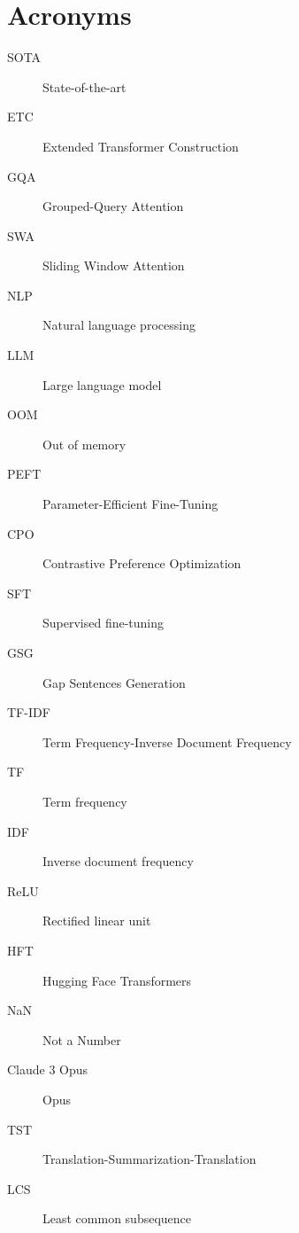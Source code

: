 \documentclass[english, ba, kiv, he, iso690numb, pdf, viewonly]{fasthesis}
\begin{document}
\chapter{Acronyms}
\begin{description}
\item[SOTA] State-of-the-art 
\item[ETC] Extended Transformer Construction
\item[GQA] Grouped-Query Attention
\item[SWA] Sliding Window Attention
\item[NLP] Natural language processing
\item[LLM] Large language model
\item[OOM] Out of memory
\item[PEFT] Parameter-Efficient Fine-Tuning
\item[CPO] Contrastive Preference Optimization
\item[SFT] Supervised fine-tuning
\item[GSG] Gap Sentences Generation
\item[TF-IDF] Term Frequency-Inverse Document Frequency
\item[TF] Term frequency
\item[IDF] Inverse document frequency
\item[ReLU] Rectified linear unit
\item[HFT] Hugging Face Transformers
\item[NaN] Not a Number
\item[Claude 3 Opus] Opus
\item[TST] Translation-Summarization-Translation
\item[LCS] Least common subsequence
\end{description}
%
%
%
%

%
%
%
%


%
%
%
%
\backmatter
\printbibliography
\listoffigures
\listoftables
\listoflistings
%
%
\setbackpageqrcode
\backpage
\end{document}
